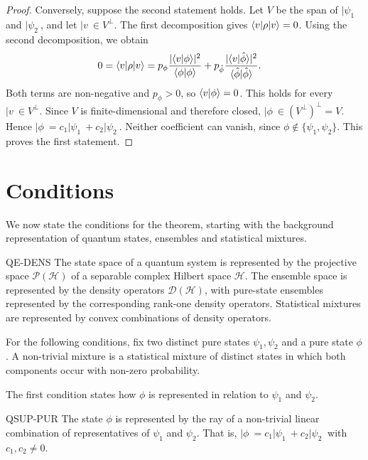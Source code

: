 \documentclass{techbrief}
\begin{document}
\begin{proof}
	Conversely, suppose the second statement holds. Let $V$ be the span of $|\psi_1\>$ and $|\psi_2\>$, and let $|v\>\in V^\perp$. The first decomposition gives $\langle v|\rho|v\rangle=0$. Using the second decomposition, we obtain
	\begin{equation*}
		\begin{aligned}
			0=\langle v|\rho|v\rangle
			&=p_\phi\frac{|\langle v|\phi\rangle|^2}{\langle\phi|\phi\rangle}
			+p_{\hat{\phi}}\frac{|\langle v|\hat{\phi}\rangle|^2}{\langle\hat{\phi}|\hat{\phi}\rangle}.
		\end{aligned}
	\end{equation*}
	Both terms are non-negative and $p_\phi>0$, so $\langle v|\phi\rangle=0$. This holds for every $|v\>\in V^\perp$. Since $V$ is finite-dimensional and therefore closed, $|\phi\>\in(V^\perp)^\perp=V$. Hence $|\phi\>=c_1|\psi_1\>+c_2|\psi_2\>$. Neither coefficient can vanish, since $\phi\notin\{\psi_1,\psi_2\}$. This proves the first statement.
\end{proof}

\section{Conditions}

We now state the conditions for the theorem, starting with the background representation of quantum states, ensembles and statistical mixtures.

\begin{condition}{QE-DENS}
	The state space of a quantum system is represented by the projective space $\mathcal{P}(\mathcal{H})$ of a separable complex Hilbert space $\mathcal{H}$. The ensemble space is represented by the density operators $\mathcal{D}(\mathcal{H})$, with pure-state ensembles represented by the corresponding rank-one density operators. Statistical mixtures are represented by convex combinations of density operators.
\end{condition}

For the following conditions, fix two distinct pure states $\psi_1,\psi_2$ and a pure state $\phi$. A non-trivial mixture is a statistical mixture of distinct states in which both components occur with non-zero probability.

The first condition states how $\phi$ is represented in relation to $\psi_1$ and $\psi_2$.

\begin{condition}{QSUP-PUR}
	The state $\phi$ is represented by the ray of a non-trivial linear combination of representatives of $\psi_1$ and $\psi_2$. That is, $|\phi\>=c_1|\psi_1\>+c_2|\psi_2\>$ with $c_1,c_2\neq0$.
\end{condition}
\end{document}
